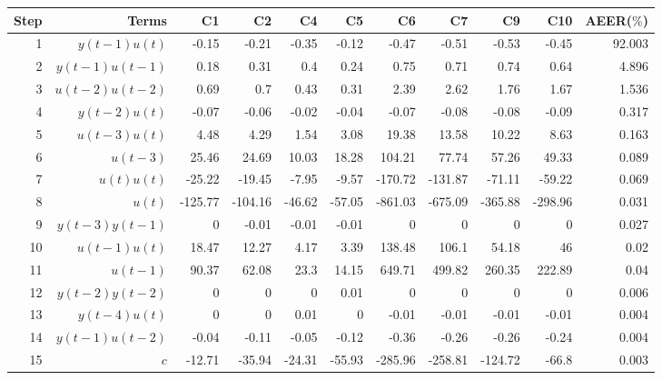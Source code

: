 \begin{tabular}{rrrrrrrrrrr}
Step & Terms & C1 & C2 & C4 & C5 & C6 & C7 & C9 & C10 & AEER($\%$) \\ 
\hline 
1 & $y(t-1)u(t)$ & -0.15 & -0.21 & -0.35 & -0.12 & -0.47 & -0.51 & -0.53 & -0.45 & 92.003 \\ 
2 & $y(t-1)u(t-1)$ & 0.18 & 0.31 & 0.4 & 0.24 & 0.75 & 0.71 & 0.74 & 0.64 & 4.896 \\ 
3 & $u(t-2)u(t-2)$ & 0.69 & 0.7 & 0.43 & 0.31 & 2.39 & 2.62 & 1.76 & 1.67 & 1.536 \\ 
4 & $y(t-2)u(t)$ & -0.07 & -0.06 & -0.02 & -0.04 & -0.07 & -0.08 & -0.08 & -0.09 & 0.317 \\ 
5 & $u(t-3)u(t)$ & 4.48 & 4.29 & 1.54 & 3.08 & 19.38 & 13.58 & 10.22 & 8.63 & 0.163 \\ 
6 & $u(t-3)$ & 25.46 & 24.69 & 10.03 & 18.28 & 104.21 & 77.74 & 57.26 & 49.33 & 0.089 \\ 
7 & $u(t)u(t)$ & -25.22 & -19.45 & -7.95 & -9.57 & -170.72 & -131.87 & -71.11 & -59.22 & 0.069 \\ 
8 & $u(t)$ & -125.77 & -104.16 & -46.62 & -57.05 & -861.03 & -675.09 & -365.88 & -298.96 & 0.031 \\ 
9 & $y(t-3)y(t-1)$ & 0 & -0.01 & -0.01 & -0.01 & 0 & 0 & 0 & 0 & 0.027 \\ 
10 & $u(t-1)u(t)$ & 18.47 & 12.27 & 4.17 & 3.39 & 138.48 & 106.1 & 54.18 & 46 & 0.02 \\ 
11 & $u(t-1)$ & 90.37 & 62.08 & 23.3 & 14.15 & 649.71 & 499.82 & 260.35 & 222.89 & 0.04 \\ 
12 & $y(t-2)y(t-2)$ & 0 & 0 & 0 & 0.01 & 0 & 0 & 0 & 0 & 0.006 \\ 
13 & $y(t-4)u(t)$ & 0 & 0 & 0.01 & 0 & -0.01 & -0.01 & -0.01 & -0.01 & 0.004 \\ 
14 & $y(t-1)u(t-2)$ & -0.04 & -0.11 & -0.05 & -0.12 & -0.36 & -0.26 & -0.26 & -0.24 & 0.004 \\ 
15 & $c$ & -12.71 & -35.94 & -24.31 & -55.93 & -285.96 & -258.81 & -124.72 & -66.8 & 0.003 \\ 
\hline 
\end{tabular}